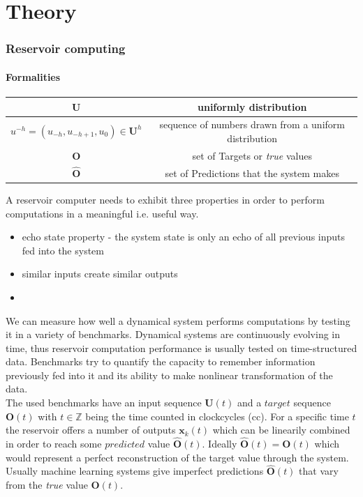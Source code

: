 \chapter{Theory}

\subsection{Reservoir computing}


	\subsubsection{Formalities}

\begin{tabular}{c|c}
	\hline
	\textbf{U}& uniformly distribution \\
	\hline
	$u^{-h}=(u_{-h},u_{-h+1},u_{0}) \in \textbf{U}^h$ & sequence of numbers drawn from a uniform distribution  \\	
	\hline
	$\textbf{O}$ & set of Targets or \emph{true} values \\
	\hline
	$\hat{\textbf{O}}$ & set of Predictions that the system makes\\
	\hline
\end{tabular}

A reservoir computer needs to exhibit three properties in order to perform computations in a meaningful i.e. useful way.

\begin{itemize}
	\item echo state property - the system state is only an echo of all previous inputs fed into the system
	\item similar inputs create similar outputs
	\item
\end{itemize}


We can measure how well a dynamical system performs computations by testing it in a variety of benchmarks. Dynamical systems are continuously evolving in time, thus reservoir computation performance is usually tested on time-structured data. Benchmarks try to quantify the capacity to remember information previously fed into it and its ability to make nonlinear transformation of the data.\\ 

The used benchmarks have an input sequence $\textbf{U}(t)$ and a $target$ sequence $\textbf{O}(t)$ with $t \in \mathbb{Z}$ being the time counted in clockcycles (cc). For a specific time $t$ the reservoir offers a number of outputs $\textbf{x}_{k}(t)$ which can be linearily combined in order to reach some $predicted$ value $\hat{\textbf{O}}(t)$. Ideally $\hat{\textbf{O}}(t) = \textbf{O}(t)$ which would represent a perfect reconstruction of the target value through the system. Usually machine learning systems give imperfect predictions $\hat{\textbf{O}}(t)$ that vary from the \emph{true} value $\textbf{O}(t)$.

